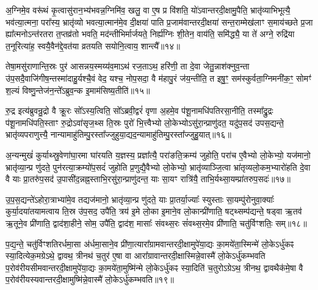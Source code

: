 अ॒ग्निमे॒व वरू॑थं कृ॒त्वासु॑रान॒भ्य॑भवन्न॒ग्निमि॑व॒ खलु॒ वा ए॒ष प्र वि॑शति॒ यो॑\-ऽवान्तरदी॒क्षामु॒पैति॒ भ्रातृ॑व्याभिभूत्यै॒ भव॑त्या॒त्मना॒ परा᳚स्य॒ भ्रातृ॑व्यो भवत्या॒त्मान॑मे॒व दी॒क्षया॑ पाति प्र॒जाम॑वान्तरदी॒क्षया॑ सन्त॒राम्मेख॑लाꣳ स॒माय॑च्छते प्र॒जा ह्या᳚त्मनो\-ऽन्त॑रतरा त॒प्तव्र॑तो भवति॒ मद॑न्तीभिर्मार्जयते॒ निर्\mbox{}ह्य॑ग्निः शी॒तेन॒ वाय॑ति॒ समि॑द्ध्यै॒ या ते॑ अग्ने॒ रुद्रि॑या त॒नूरित्या॑ह॒ स्वयै॒वैन॑द्दे॒वत॑या व्रतयति सयोनि॒त्वाय॒ शान्त्यै᳚॥१४॥

{\anuvakamend[{यो वा ओज॑ आह॒ यद॑शी॒येति॒ ते᳚\-ऽग्न॒ एका॑दश च}]}%

तेषा॒मसु॑राणान्ति॒स्रः पुर॑ आसन्नय॒स्मय्य॑व॒मा\-ऽथ॑ रज॒ता\-ऽथ॒ हरि॑णी॒ ता दे॒वा जेतु॒न्नाश॑क्नुव॒न्ता उ॑प॒सदै॒वाजि॑गीष॒न्तस्मा॑दाहु॒र्यश्चै॒वं वेद॒ यश्च॒ नोप॒सदा॒ वै म॑हापु॒रं ज॑य॒न्तीति॒ त इषु॒ꣳ॒ सम॑स्कुर्वता॒ग्निमनी॑क॒ꣳ॒ सोमꣳ॑ श॒ल्यं विष्णु॒न्तेज॑न॒न्ते᳚\-ऽब्रुव॒न्क इ॒माम॑सिष्य॒तीति॑॥१५॥

रु॒द्र इत्य॑ब्रुवन्रु॒द्रो वै क्रू॒रः सो᳚\-ऽस्य॒त्विति॒ सो᳚\-ऽब्रवी॒द्वरं॑ वृणा अ॒हमे॒व प॑शू॒नामधि॑पतिरसा॒नीति॒ तस्मा᳚द्रु॒द्रः प॑शू॒नामधि॑पति॒स्ताꣳ रु॒द्रो\-ऽवा॑सृज॒थ्स ति॒स्रः पुरो॑ भि॒त्त्वैभ्यो लो॒केभ्यो\-ऽसु॑रा॒न्प्राणु॑दत॒ यदु॑प॒सद॑ उपस॒द्यन्ते॒ भ्रातृ॑व्यपराणुत्त्यै॒ नान्यामाहु॑तिम्पु॒रस्ता᳚ज्जुहुया॒द्यद॒न्यामाहु॑तिम्पु॒रस्ता᳚ज्जुहु॒यात्॥१६॥

अ॒न्यन्मुखं॑ कुर्याथ्स्रु॒वेणा॑घा॒रमा घा॑रयति य॒ज्ञस्य॒ प्रज्ञा᳚त्यै॒ परा॑ङति॒क्रम्य॑ जुहोति॒ परा॑च ए॒वैभ्यो लो॒केभ्यो॒ यज॑मानो॒ भ्रातृ॑व्या॒न्प्र णु॑दते॒ पुन॑रत्या॒क्रम्यो॑प॒सदं॑ जुहोति प्र॒णुद्यै॒वैभ्यो लो॒केभ्यो॒ भ्रातृ॑व्याञ्जि॒त्वा भ्रा॑तृव्यलो॒कम॒भ्यारो॑हति दे॒वा वै याः प्रा॒तरु॑प॒सद॑ उ॒पासी॑द॒न्नह्न॒स्ताभि॒रसु॑रा॒न्प्राणु॑दन्त॒ याः सा॒यꣳ रात्रि॑यै॒ ताभि॒र्यथ्सा॒यम्प्रा॑तरुप॒सदः॑॥१७॥

उ॒प॒स॒द्यन्ते॑\-ऽहोरा॒त्राभ्या॑मे॒व तद्यज॑मानो॒ भ्रातृ॑व्या॒न्प्र णु॑दते॒ याः प्रा॒तर्या॒ज्याः᳚ स्युस्ताः सा॒यम्पु॑रोनुवा॒क्याः᳚ कुर्या॒दया॑तयामत्वाय ति॒स्र उ॑प॒सद॒ उपै॑ति॒ त्रय॑ इ॒मे लो॒का इ॒माने॒व लो॒कान्प्री॑णाति॒ षट्थ्सम्प॑द्यन्ते॒ षड्वा ऋ॒तव॑ ऋ॒तूने॒व प्री॑णाति॒ द्वाद॑शा॒हीने॒ सोम॒ उपै॑ति॒ द्वाद॑श॒ मासाः᳚ संवथ्स॒रः सं॑वथ्स॒रमे॒व प्री॑णाति॒ चतु॑र्विꣳशतिः॒ सम्॥१८॥

प॒द्य॒न्ते॒ चतु॑र्विꣳशतिरर्धमा॒सा अ॑र्धमा॒साने॒व प्री॑णा॒त्यारा᳚ग्रामवान्तरदी॒क्षामुपे॑या॒द्यः का॒मये॑ता॒स्मिन्मे॑ लो॒के\-ऽर्धु॑कꣴ स्या॒दित्येक॒मग्रे\-ऽथे॒ द्वावथ॒ त्रीनथ॑ च॒तुर॑ ए॒षा वा आरा᳚ग्रावान्तरदी॒क्षास्मिन्ने॒वास्मै॑ लो॒के\-ऽर्धु॑कम्भवति प॒रोव॑रीयसीमवान्तरदी॒क्षामुपे॑या॒द्यः का॒मये॑ता॒मुष्मि॑न्मे लो॒के\-ऽर्धु॑कꣴ स्या॒दिति॑ च॒तुरो\-ऽग्रे\-ऽथ॒ त्रीनथ॒ द्वावथैक॑मे॒षा वै प॒रोव॑रीयस्यवान्तरदी॒क्षामुष्मि॑न्ने॒वास्मै॑ लो॒के\-ऽर्धु॑कम्भवति॥१९॥

